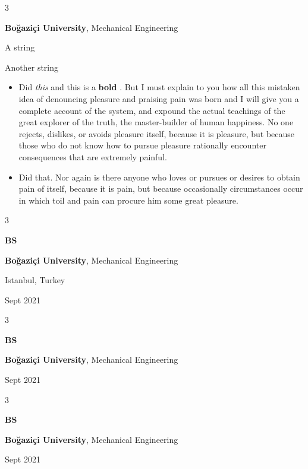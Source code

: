 \documentclass[10pt, letterpaper]{article}
\newenvironment{summary}{
    \begin{description}[
        topsep=0.10 cm,
        parsep=0.10 cm,
        partopsep=0pt,
        itemsep=0pt,
        leftmargin=0.4 cm + 10pt
    ]
}{
    \end{description}
} %
\newenvironment{highlights}{
    \begin{itemize}[
        topsep=0.10 cm,
        parsep=0.10 cm,
        partopsep=0pt,
        itemsep=0pt,
        leftmargin=0.4 cm + 10pt
    ]
}{
    \end{itemize}
} %
\newenvironment{threecolentry}[3][]{
    \onecolentry
    \def\thirdColumn{#3}
    \setcolumnwidth{1 cm, \fill, 4.5 cm}
    \begin{paracol}{3}
    {\raggedright #2} \switchcolumn
}{
    \switchcolumn \raggedleft \thirdColumn
    \end{paracol}
    \endonecolentry
} %
\let\hrefWithoutArrow\href
\renewcommand{\href}[2]{\hrefWithoutArrow{#1}{\ifthenelse{\equal{#2}{}}{ }{#2 }\raisebox{.15ex}{\footnotesize \faExternalLink*}}}
\begin{document}
        \begin{threecolentry}{\textbf{}}{
            
        }
            \textbf{Boğaziçi University}, Mechanical Engineering
            \begin{summary}
                \item A string
                \item Another string
            \end{summary}
            \begin{highlights}
                \item Did \textit{this} and this is a \textbf{bold} \href{https://example.com}{link}. But I must explain to you how all this mistaken idea of denouncing pleasure and praising pain was born and I will give you a complete account of the system, and expound the actual teachings of the great explorer of the truth, the master-builder of human happiness. No one rejects, dislikes, or avoids pleasure itself, because it is pleasure, but because those who do not know how to pursue pleasure rationally encounter consequences that are extremely painful.
                \item Did that. Nor again is there anyone who loves or pursues or desires to obtain pain of itself, because it is pain, but because occasionally circumstances occur in which toil and pain can procure him some great pleasure.
            \end{highlights}
        \end{threecolentry}

        \vspace{0.2 cm}

        \begin{threecolentry}{\textbf{BS}}{
            Istanbul, Turkey

        Sept 2021
        }
            \textbf{Boğaziçi University}, Mechanical Engineering
        \end{threecolentry}

        \vspace{0.2 cm}

        \begin{threecolentry}{\textbf{BS}}{
            Sept 2021
        }
            \textbf{Boğaziçi University}, Mechanical Engineering
        \end{threecolentry}

        \vspace{0.2 cm}

        \begin{threecolentry}{\textbf{BS}}{
            Sept 2021
        }
            \textbf{Boğaziçi University}, Mechanical Engineering
        \end{threecolentry}
\end{document}
